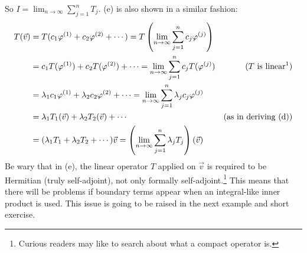 So $I = \lim_{n \to \infty} \sum_{j=1}^{n} T_j$. (e) is also shown in a similar fashion:
\begin{align*}
T(\vec{v}) &= T(c_1\varphi^{(1)} + c_2\varphi^{(2)} + \cdots) = T\left(\lim_{n \to \infty} \sum_{j=1}^{n} c_j\varphi^{(j)}\right) \\
&= c_1T(\varphi^{(1)}) + c_2T(\varphi^{(2)}) + \cdots = \lim_{n \to \infty} \sum_{j=1}^{n} c_jT(\varphi^{(j)}) & \text{($T$ is linear\footnotemark)}\\
&= \lambda_1 c_1\varphi^{(1)} + \lambda_2 c_2\varphi^{(2)} + \cdots =  \lim_{n \to \infty} \sum_{j=1}^{n} \lambda_jc_j\varphi^{(j)} \\
&= \lambda_1 T_1(\vec{v}) + \lambda_2 T_2(\vec{v}) + \cdots & \text{(as in deriving (d))} \\
&= (\lambda_1T_1 + \lambda_2T_2 + \cdots)\vec{v} = \left(\lim_{n \to \infty} \sum_{j=1}^{n} \lambda_jT_j\right)(\vec{v}) 
\end{align*}
Be wary that in (e), the linear operator $T$ applied on $\vec{v}$ is required to be Hermitian (truly self-adjoint), not only formally self-adjoint.\footnote{Curious readers may like to search about what a compact operator is.} This means that there will be problems if boundary terms appear when an integral-like inner product is used. This issue is going to be raised in the next example and short exercise.\par

